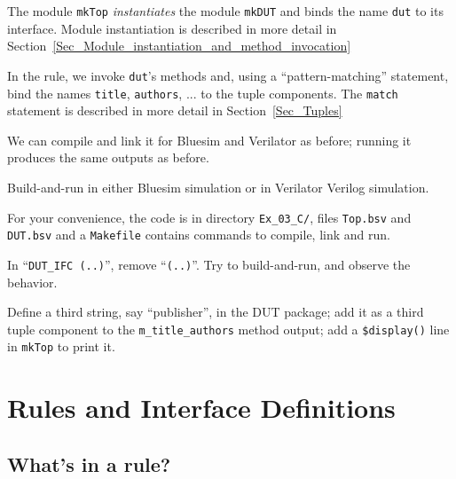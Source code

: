 The module \verb|mkTop| \emph{instantiates} the module \verb|mkDUT|
and binds the name \verb|dut| to its interface.  Module instantiation
is described in more detail in
Section~\ref{Sec_Module_instantiation_and_method_invocation}

In the rule, we invoke \verb|dut|'s methods and, using a
``pattern-matching'' statement, bind the names \verb|title|,
\verb|authors|, ... {\etc} to the tuple components. The \verb|match|
statement is described in more detail in Section~\ref{Sec_Tuples}

We can compile and link it for Bluesim and Verilator as before;
running it produces the same outputs as before.

\Beginexercise

\Exercise

Build-and-run in either Bluesim simulation or in Verilator Verilog
simulation.

For your convenience, the code is in directory \verb|Ex_03_C/|, files
\verb|Top.bsv| and \verb|DUT.bsv| and a \verb|Makefile| contains
commands to compile, link and run.

\Exercise

In ``\verb|DUT_IFC (..)|'', remove ``\verb|(..)|''.  Try to
build-and-run, and observe the behavior.

\Exercise

Define a third string, say ``publisher'', in the DUT package; add it
as a third tuple component to the \verb|m_title_authors| method
output; add a \verb|$display()| line in \verb|mkTop| to print it.

\Endexercise


\section{Rules and Interface Definitions}

\label{Sec_Rules_and_Interface_Defs}


\subsection{What's in a rule?}


